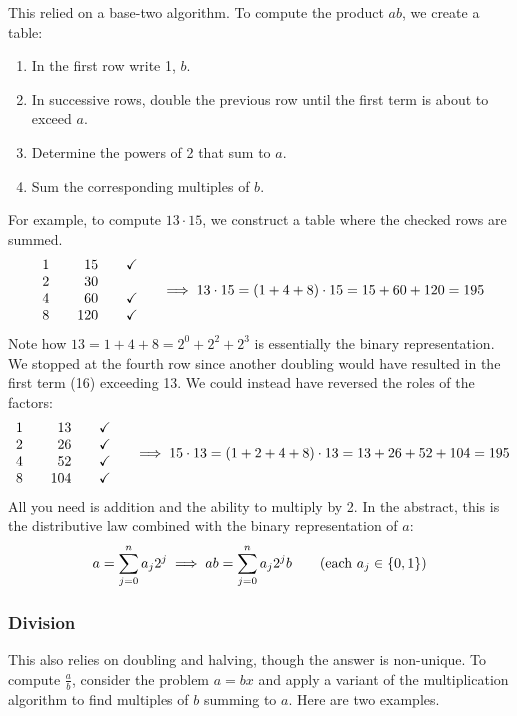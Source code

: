 This relied on a base-two algorithm. To compute the product $ab$, we create a table:
\begin{enumerate}
  \item In the first row write 1, $b$.
  \item In successive rows, double the previous row until the first term is about to exceed $a$.
  \item Determine the powers of 2 that sum to $a$.
  \item Sum the corresponding multiples of $b$.
\end{enumerate}
For example, to compute $13\cdot 15$, we construct a table where the checked rows are summed.
\[
	\begin{array}{r@{\qquad}r@{\qquad}c}
		1&15&\checkmark\\
		2&30&\\
		4&60&\checkmark\\
		8&120&\checkmark
	\end{array}
	\quad\implies 13\cdot 15=(1+4+8)\cdot 15=15+60+120=195
\]
Note how $13=1+4+8=2^0+2^2+2^3$ is essentially the binary representation. We stopped at the fourth row since another doubling would have resulted in the first term (16) exceeding 13. We could instead have reversed the roles of the factors:
\[
	\begin{array}{r@{\qquad}r@{\qquad}c}
		1&13&\checkmark\\
		2&26&\checkmark\\
		4&52&\checkmark\\
		8&104&\checkmark
	\end{array}
	\quad\implies 15\cdot 13=(1+2+4+8)\cdot 13=13+26+52+104=195
\]
All you need is addition and the ability to multiply by 2. In the abstract, this is the distributive law combined with the binary representation of $a$:
\[
	a=\sum_{j=0}^na_j2^j\implies ab=\sum_{j=0}^na_j2^jb \tag{each $a_j\in\{0,1\}$}
\]


\subsubsection*{Division}

This also relies on doubling and halving, though the answer is non-unique. To compute $\frac ab$, consider the problem $a=bx$ and apply a variant of the multiplication algorithm to find multiples of $b$ summing to $a$. Here are two examples.

